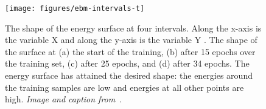 \begin{figure}[!ht]
\centering
\texttt{[image: figures/ebm-intervals-t]}
\caption[Energy surface evolution]{The shape of the energy surface at four intervals. Along the x-axis is the variable X and along the y-axis is the variable Y . The shape of the surface at (a) the start of the training, (b) after 15 epochs over the training set, (c) after 25 epochs, and (d) after 34 epochs. The energy surface has attained the desired shape: the energies around the training samples are low and energies at all other points are high. \textit{Image and caption from} \,\citep{ebm-tutorial}.}
\label{fig:ebm-intervals}
\end{figure}